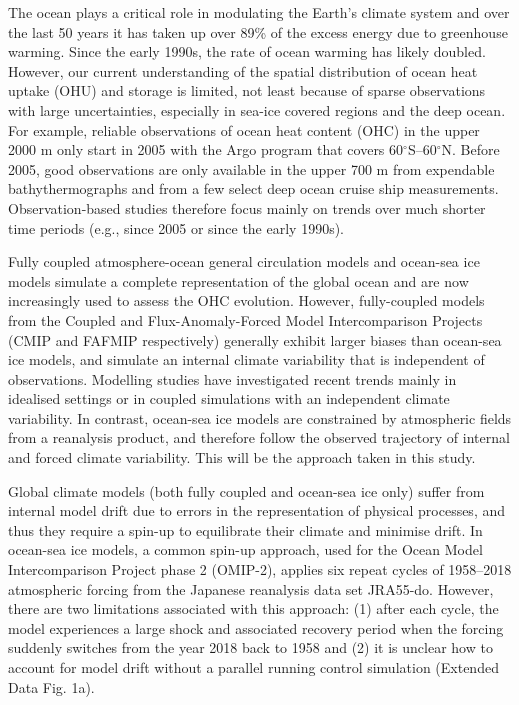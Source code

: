 \documentclass{nature}
\begin{document}
	The ocean plays a critical role in modulating the Earth's climate system and over the last 50 years it has taken up over 89\% of the excess energy due to greenhouse warming\cite{schuckman2020heat,rhein2013ocean,levitus2012global,IPCCAR5SPM,meyssignac2019estimate}. Since the early 1990s, the rate of ocean warming has likely doubled\cite{IPCC2019SROC}. However, our current understanding of the spatial distribution of ocean heat uptake (OHU) and storage is limited, not least because of sparse observations with large uncertainties, especially in sea-ice covered regions\cite{durack2014quantifying} and the deep ocean\cite{levitus2012global}. For example, reliable observations of ocean heat content (OHC) in the upper 2000 m only start in 2005 with the Argo program that covers 60$^{\circ}$S--60$^{\circ}$N\cite{argo2000float}. Before 2005, good observations are only available in the upper 700 m from expendable bathythermographs\cite{abraham2013xbt} and from a few select deep ocean cruise ship measurements\cite{purkey2010abyssal,desbruyeres2016abyssal}. Observation-based studies therefore focus mainly on trends over much shorter time periods (e.g., since 2005\cite{roemmich2015planetary} or since the early 1990s\cite{shi2021SOwarmingzonal}).
	
	Fully coupled atmosphere-ocean general circulation models and ocean-sea ice models simulate a complete representation of the global ocean and are now increasingly used to assess the OHC evolution. However, fully-coupled models from the Coupled and Flux-Anomaly-Forced Model Intercomparison Projects (CMIP\cite{eyring2016cmip6} and FAFMIP\cite{gregory2016FAFMIP} respectively) generally exhibit larger biases than ocean-sea ice models, and simulate an internal climate variability that is independent of observations. Modelling studies have investigated recent trends mainly in idealised settings\cite{gregory2016FAFMIP,dias2020heatstorage} or in coupled simulations with an independent climate variability\cite{frolicher2015dominance,eyring2016cmip6}. In contrast, ocean-sea ice models are constrained by atmospheric fields from a reanalysis product, and therefore follow the observed trajectory of internal and forced climate variability. This will be the approach taken in this study.
	
	Global climate models (both fully coupled and ocean-sea ice only) suffer from internal model drift due to errors in the representation of physical processes, and thus they require a spin-up to equilibrate their climate and minimise drift. In ocean-sea ice models, a common spin-up approach, used for the Ocean Model Intercomparison Project phase 2 (OMIP-2)\cite{tsujino2020omip}, applies six repeat cycles of 1958--2018 atmospheric forcing from the Japanese reanalysis data set JRA55-do\cite{tsujino2018jra}. However, there are two limitations associated with this approach: (1) after each cycle, the model experiences a large shock and associated recovery period when the forcing suddenly switches from the year 2018 back to 1958 and (2) it is unclear how to account for model drift without a parallel running control simulation (Extended Data Fig. 1a).
	
\end{document}
